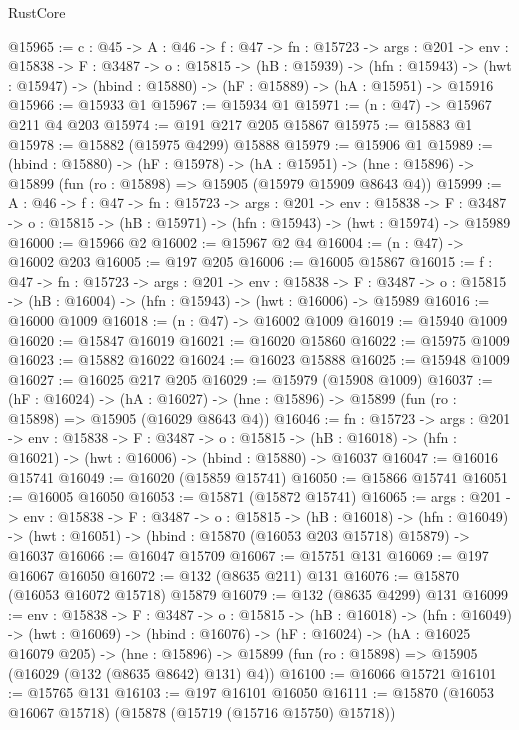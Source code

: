 \begin{lexlean}{RustCore}
\begin{coremodule}
@15965 := {c : @45} ->
  {A : @46} ->
  {f : @47} ->
  {fn : @15723} ->
  {args : @201} ->
  {env : @15838} ->
  {F : @3487} ->
  {o : @15815} ->
  (hB : @15939) ->
  (hfn : @15943) -> (hwt : @15947) -> (hbind : @15880) -> (hF : @15889) -> (hA : @15951) -> @15916
@15966 := @15933 @1
@15967 := @15934 @1
@15971 := (n : @47) -> @15967 @211 @4 @203
@15974 := @191 @217 @205 @15867
@15975 := @15883 @1
@15978 := @15882 (@15975 @4299) @15888
@15979 := @15906 @1
@15989 := (hbind : @15880) ->
  (hF : @15978) ->
  (hA : @15951) -> (hne : @15896) -> @15899 (fun (ro : @15898) => @15905 (@15979 @15909 @8643 @4))
@15999 := {A : @46} ->
  {f : @47} ->
  {fn : @15723} ->
  {args : @201} ->
  {env : @15838} ->
  {F : @3487} -> {o : @15815} -> (hB : @15971) -> (hfn : @15943) -> (hwt : @15974) -> @15989
@16000 := @15966 @2
@16002 := @15967 @2 @4
@16004 := (n : @47) -> @16002 @203
@16005 := @197 @205
@16006 := @16005 @15867
@16015 := {f : @47} ->
  {fn : @15723} ->
  {args : @201} ->
  {env : @15838} ->
  {F : @3487} -> {o : @15815} -> (hB : @16004) -> (hfn : @15943) -> (hwt : @16006) -> @15989
@16016 := @16000 @1009
@16018 := (n : @47) -> @16002 @1009
@16019 := @15940 @1009
@16020 := @15847 @16019
@16021 := @16020 @15860
@16022 := @15975 @1009
@16023 := @15882 @16022
@16024 := @16023 @15888
@16025 := @15948 @1009
@16027 := @16025 @217 @205
@16029 := @15979 (@15908 @1009)
@16037 := (hF : @16024) ->
  (hA : @16027) -> (hne : @15896) -> @15899 (fun (ro : @15898) => @15905 (@16029 @8643 @4))
@16046 := {fn : @15723} ->
  {args : @201} ->
  {env : @15838} ->
  {F : @3487} ->
  {o : @15815} -> (hB : @16018) -> (hfn : @16021) -> (hwt : @16006) -> (hbind : @15880) -> @16037
@16047 := @16016 @15741
@16049 := @16020 (@15859 @15741)
@16050 := @15866 @15741
@16051 := @16005 @16050
@16053 := @15871 (@15872 @15741)
@16065 := {args : @201} ->
  {env : @15838} ->
  {F : @3487} ->
  {o : @15815} ->
  (hB : @16018) ->
  (hfn : @16049) -> (hwt : @16051) -> (hbind : @15870 (@16053 @203 @15718) @15879) -> @16037
@16066 := @16047 @15709
@16067 := @15751 @131
@16069 := @197 @16067 @16050
@16072 := @132 (@8635 @211) @131
@16076 := @15870 (@16053 @16072 @15718) @15879
@16079 := @132 (@8635 @4299) @131
@16099 := {env : @15838} ->
  {F : @3487} ->
  {o : @15815} ->
  (hB : @16018) ->
  (hfn : @16049) ->
  (hwt : @16069) ->
  (hbind : @16076) ->
  (hF : @16024) ->
  (hA : @16025 @16079 @205) ->
  (hne : @15896) -> @15899 (fun (ro : @15898) => @15905 (@16029 (@132 (@8635 @8642) @131) @4))
@16100 := @16066 @15721
@16101 := @15765 @131
@16103 := @197 @16101 @16050
@16111 := @15870 (@16053 @16067 @15718) (@15878 (@15719 (@15716 @15750) @15718))

\end{coremodule}
\end{lexlean}
